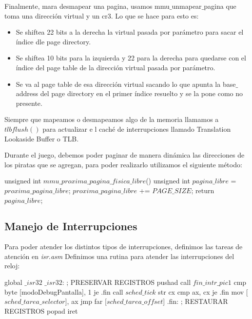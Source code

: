 Finalmente, mara desmapear una pagina, usamos mmu$\_$unmapear$\_$pagina que toma una dirección virtual y un cr3. Lo que se hace para esto es:
\begin{itemize}
	\item Se shiftea 22 bits a la derecha la virtual pasada por parámetro para sacar el índice dle page directory.
	\item Se shiftea 10 bits para la izquierda y 22 para la derecha para quedarse con el índice del page table de la dirección virtual pasada por parámetro.
	\item Se va al page table de esa dirección virtual sacando lo que apunta la base$\_$address del page directory en el primer índice resuelto y se la pone como no presente.
\end{itemize}
Siempre que mapeamos o desmapeamos algo de la memoria llamamos a $tlbflush()$ para actualizar e	l caché de interrupciones llamado Translation Lookaside Buffer o TLB.

Durante el juego, debemos poder paginar de manera din\'amica las direcciones de los piratas que se agregan, para poder realizarlo utilizamos el siguiente m\'etodo:
\begin{algorithmic}
    \State \tab unsigned int $mmu\_proxima\_pagina\_fisica\_libre$() {
  \State \tab \tab unsigned int $pagina\_libre$ = $proxima\_pagina\_libre$;
  \State \tab \tab $proxima\_pagina\_libre$ += $PAGE\_SIZE$;
  \State \tab \tab return $pagina\_libre$;
\State \tab }
\end{algorithmic}


\subsection{Manejo de Interrupciones}
Para poder atender los distintos tipos de interrupciones, definimos las tareas de atenci\'on en \textit{isr.asm}
Definimos una rutina para atender las interrupciones del reloj:
\begin{algorithmic}
    \State \tab global $\_isr32$
\State \tab $\_isr32$:
  \State \tab \tab; PRESERVAR REGISTROS
  \State \tab \tab pushad
  \State \tab \tab call $fin\_intr\_pic1$
  \State \tab \tab cmp byte [modoDebugPantalla], 1
  \State \tab \tab je .fin
\State \tab \tab  call $sched\_tick$
  \State \tab \tab str cx
  \State \tab \tab cmp ax, cx
  \State \tab \tab je .fin
  \State \tab \tab mov [$sched\_tarea\_selector$], ax
  \State \tab \tab jmp far [$sched\_tarea\_offset$]
\State \tab \tab .fin:
  \State \tab \tab ; RESTAURAR REGISTROS
  \State \tab \tab popad
  \State \tab \tab iret
\end{algorithmic}

